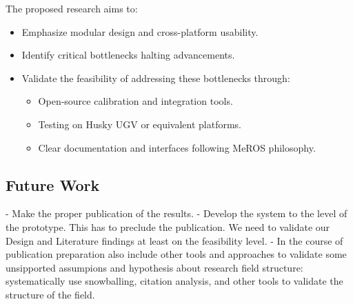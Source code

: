 \documentclass[runningheads]{llncs}
\begin{document}
The proposed research aims to:
\begin{itemize}
  \item Emphasize modular design and cross-platform usability.
  \item Identify critical bottlenecks halting advancements.
  \item Validate the feasibility of addressing these bottlenecks through:
        \begin{itemize}
          \item Open-source calibration and integration tools.
          \item Testing on Husky UGV or equivalent platforms.
          \item Clear documentation and interfaces following MeROS philosophy.
        \end{itemize}
\end{itemize}


\subsection{Future Work}
- Make the proper publication of the results.
- Develop the system to the level of the prototype. This has to preclude the publication. We need to validate our Design and Literature findings at least on the feasibility level.
- In the course of publication preparation also include other tools and approaches to validate some unsipported assumpions and hypothesis about research field structure: systematically use snowballing, citation analysis, and other tools to validate the structure of the field.

\printbibliography
\end{document}
